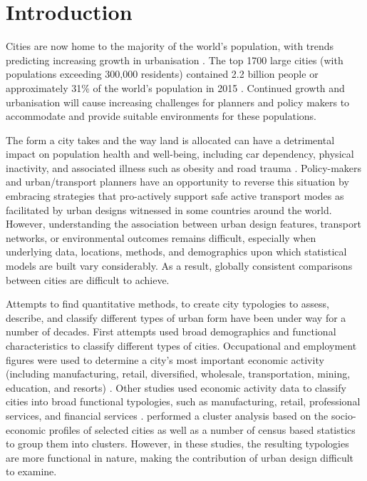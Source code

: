 \documentclass[Crown,sageh,times]{sagej}
\begin{document}
\maketitle



\section{Introduction}\label{sec:introduction}

Cities are now home to the majority of the world's population, with trends predicting increasing growth in urbanisation \citep{UNDESA2015,WHO2016,ABS2008}. The top 1700 large cities (with populations exceeding 300,000 residents) contained 2.2 billion people or approximately 31\% of the world's population in 2015 \citep{UN2014}. Continued growth and urbanisation will cause increasing challenges for planners and policy makers to accommodate and provide suitable environments for these populations.

The form a city takes and the way land is allocated can have a detrimental impact on population health and well-being, including car dependency, physical inactivity, and associated illness such as obesity and road trauma \citep{Giles-corti2016,Kleinert2016,Goenka2016,Zapata-Diomedi2017,Heesch2014,Daley2011, Cepeda2016,MingWen2008,Norman2006,Thompson2018b}. Policy-makers and urban/transport planners have an opportunity to reverse this situation by embracing strategies that pro-actively support safe active transport modes as facilitated by urban designs witnessed in some countries around the world. However, understanding the association between urban design features, transport networks, or environmental outcomes remains difficult, especially when underlying data, locations, methods, and demographics upon which statistical models are built vary considerably. As a result, globally consistent comparisons between cities are difficult to achieve. 

Attempts to find quantitative methods, to create city typologies to assess, describe, and classify different types of urban form have been under way for a number of decades. First attempts used broad demographics and functional characteristics to classify different types of cities. Occupational and employment figures were used to determine a city's most important economic activity (including manufacturing, retail, diversified, wholesale, transportation, mining, education, and resorts) \citep{Harris1943}. Other studies used economic activity data to classify cities into broad functional typologies, such as manufacturing, retail, professional services, and financial services \citep{Nelson1955}. \citet{Bruce1971} performed a cluster analysis based on the socio-economic profiles of selected cities as well as a number of census based statistics to group them into clusters. However, in these studies, the resulting typologies are more functional in nature, making the contribution of urban design difficult to examine.
\end{document}
